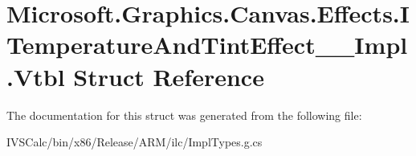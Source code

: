 \hypertarget{struct_microsoft_1_1_graphics_1_1_canvas_1_1_effects_1_1_i_temperature_and_tint_effect_____impl_1_1_vtbl}{}\section{Microsoft.\+Graphics.\+Canvas.\+Effects.\+I\+Temperature\+And\+Tint\+Effect\+\_\+\+\_\+\+Impl.\+Vtbl Struct Reference}
\label{struct_microsoft_1_1_graphics_1_1_canvas_1_1_effects_1_1_i_temperature_and_tint_effect_____impl_1_1_vtbl}


The documentation for this struct was generated from the following file\+:\begin{DoxyCompactItemize}
\item 
I\+V\+S\+Calc/bin/x86/\+Release/\+A\+R\+M/ilc/Impl\+Types.\+g.\+cs\end{DoxyCompactItemize}
